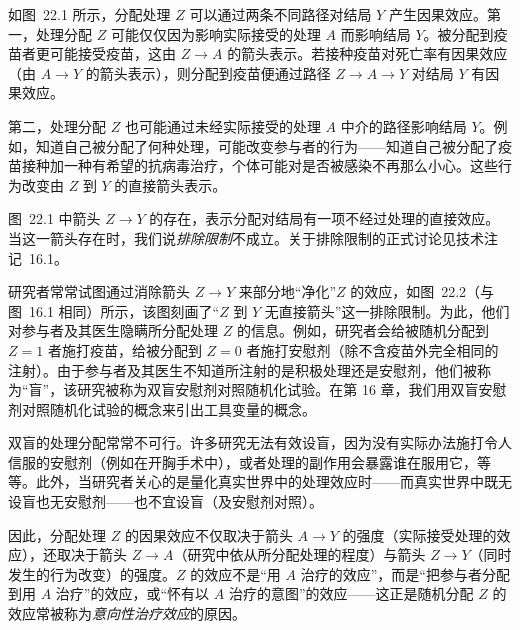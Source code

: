 如图~22.1 所示，分配处理 $Z$ 可以通过两条不同路径对结局 $Y$ 产生因果效应。第一，处理分配 $Z$ 可能仅仅因为影响实际接受的处理 $A$ 而影响结局 $Y$。被分配到疫苗者更可能接受疫苗，这由 $Z\to A$ 的箭头表示。若接种疫苗对死亡率有因果效应（由 $A\to Y$ 的箭头表示），则分配到疫苗便通过路径 $Z\to A\to Y$ 对结局 $Y$ 有因果效应。

第二，处理分配 $Z$ 也可能通过未经实际接受的处理 $A$ 中介的路径影响结局 $Y$。例如，知道自己被分配了何种处理，可能改变参与者的行为——知道自己被分配了疫苗接种加一种有希望的抗病毒治疗，个体可能对是否被感染不再那么小心。这些行为改变由 $Z$ 到 $Y$ 的直接箭头表示。

\begin{finepoint}[排除限制（再论）]
图~22.1 中箭头 $Z\to Y$ 的存在，表示分配对结局有一项不经过处理的直接效应。当这一箭头存在时，我们说\emph{排除限制}不成立。关于排除限制的正式讨论见技术注记~16.1。

研究者常常试图通过消除箭头 $Z\to Y$ 来部分地“净化”$Z$ 的效应，如图~22.2（与图~16.1 相同）所示，该图刻画了“$Z$ 到 $Y$ 无直接箭头”这一排除限制。为此，他们对参与者及其医生隐瞒所分配处理 $Z$ 的信息。例如，研究者会给被随机分配到 $Z=1$ 者施打疫苗，给被分配到 $Z=0$ 者施打安慰剂（除不含疫苗外完全相同的注射）。由于参与者及其医生不知道所注射的是积极处理还是安慰剂，他们被称为“盲”，该研究被称为双盲安慰剂对照随机化试验。在第 16 章，我们用双盲安慰剂对照随机化试验的概念来引出工具变量的概念。

双盲的处理分配常常不可行。许多研究无法有效设盲，因为没有实际办法施打令人信服的安慰剂（例如在开胸手术中），或者处理的副作用会暴露谁在服用它，等等。此外，当研究者关心的是量化真实世界中的处理效应时——而真实世界中既无设盲也无安慰剂——也不宜设盲（及安慰剂对照）。
\end{finepoint}

\begin{figure}[htbp]
\centering
{}
\caption{}
\label{fig:22.2}
\end{figure}

因此，分配处理 $Z$ 的因果效应不仅取决于箭头 $A\to Y$ 的强度（实际接受处理的效应），还取决于箭头 $Z\to A$（研究中依从所分配处理的程度）与箭头 $Z\to Y$（同时发生的行为改变）的强度。$Z$ 的效应不是“用 $A$ 治疗的效应”，而是“把参与者分配到用 $A$ 治疗”的效应，或“怀有以 $A$ 治疗的意图”的效应——这正是随机分配 $Z$ 的效应常被称为\emph{意向性治疗效应}的原因。

